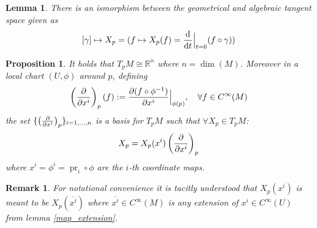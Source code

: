 \documentclass{article}
\numberwithin{theorem}{section}
\newtheorem{lemma}[theorem]{Lemma}
\newtheorem{proposition}[theorem]{Proposition}
\newtheorem*{remark}{Remark}
\newcommand{\R}{\mathbb{R}}
\newcommand{\1}{\mathds{1}}
\DeclareMathOperator{\pr}{pr}
\begin{document}
\begin{lemma}
    There is an ismorphism between the geometrical and algebraic tangent space given as 
    \[ [\gamma] \mapsto X_p = ( f \mapsto X_p(f) = \dv{}{t} \Big|_{t=0}(f \circ \gamma)) \]
\end{lemma}

\iffalse 
\begin{lemma}
    Let $p \in M$. Let $(U,\phi)$ be chart around $p$. Then there is an isomorphism 
    \[ i_{*, p} :T_pU \to T_pM \]
\end{lemma}
\fi 

\begin{proposition}
    It holds that $T_pM \cong \R^n$ where $n = \dim(M)$. Moreover in a local chart $(U, \phi)$ around $p$, defining 
    \[ \left( \pdv{}{x^i}\right)_p (f) := \pdv{(f \circ \phi^{-1})}{x^i}\Big|_{\phi(p)}, \quad \forall f \in C^\infty(M) \]
    the set $\{ \left( \pdv{}{x^i}\right)_p \}_{i=1, \dots, n }$ is a basis for $T_pM$ 
    such that $\forall X_p \in T_pM$: 
    \[ X_p = X_p(x^i) \left( \pdv{}{x^i}\right)_p \]
    where $x^i = \phi^i = \pr_i \circ \phi $ are the $i$-th coordinate maps. 
\end{proposition}
\begin{remark}
    For notational convenience it is tacitly understood that $X_p(x^i)$ is meant to be $X_p(\overline{x^i})$ where $\overline{x^i} \in C^\infty(M) $ is any  extension of $x^i \in C^\infty(U) $ from lemma \ref{map_extension}. 
\end{remark}
\end{document}
